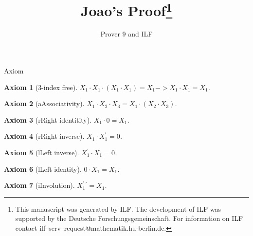 \documentclass[a4]{article}
\newcommand{\ilfUpCase}[1]{\ifmmode#1\else\uppercase{#1}\fi}
\begin{document}
\title{Joao's Proof\thanks{\fussy This manuscript was generated by ILF.
The development of ILF was supported by the Deutsche Forschungsgemeinschaft.
For information on ILF contact
ilf--serv--request@ma\-the\-ma\-tik.hu-ber\-lin.de.}}
\author{Prover 9 and ILF}
\maketitle


\expandafter\ifx\csname Axiom\endcsname\relax%

\newtheorem{Axiom}{Axiom}[section]\fi

\begin{Axiom}[{$ $3-index free$ $}]

$ X_{1} \cdot  X_{1} \cdot  (X_{1} \cdot  X_{1}) = X_{1} -> X_{1} \cdot  X_{1} = X_{1} $.

\end{Axiom}

\begin{Axiom}[{$ $\ilfUpCase{a}ssociativity$ $}]

$ X_{1} \cdot  X_{2} \cdot  X_{3} = X_{1} \cdot  (X_{2} \cdot  X_{3}) $.

\end{Axiom}

\begin{Axiom}[{$ $\ilfUpCase{r}ight identitity$ $}]

$ X_{1} \cdot  0 = X_{1} $.

\end{Axiom}

\begin{Axiom}[{$ $\ilfUpCase{r}ight inverse$ $}]

$ X_{1} \cdot  X_{1} ^{\prime}  = 0 $.

\end{Axiom}

\begin{Axiom}[{$ $\ilfUpCase{l}eft inverse$ $}]

$ X_{1} ^{\prime}  \cdot  X_{1} = 0 $.

\end{Axiom}

\begin{Axiom}[{$ $\ilfUpCase{l}eft identity$ $}]

$ 0 \cdot  X_{1} = X_{1} $.

\end{Axiom}

\begin{Axiom}[{$ $\ilfUpCase{i}nvolution$ $}]

$ X_{1} ^{\prime}  ^{\prime}  = X_{1} $.

\end{Axiom}
\end{document}
